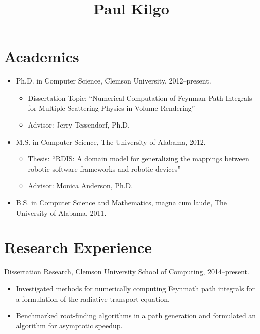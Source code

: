 \documentclass[12pt,oldfontcommands]{memoir}
\title{Paul Kilgo}
\date{}
\begin{document}
\maketitle
\thispagestyle{fancy}

\section*{Academics}

\begin{itemize}[leftmargin=*]
  \item Ph.D. in Computer Science, Clemson University, 2012--present.
  \begin{itemize}
    \item Dissertation Topic:
          ``Numerical Computation of Feynman Path Integrals for Multiple
            Scattering Physics in Volume Rendering''
    \item Advisor: Jerry Tessendorf, Ph.D.
  \end{itemize}

  \item M.S. in Computer Science, The University of Alabama, 2012.
  \begin{itemize}
    \item Thesis: ``RDIS: A domain model for generalizing the mappings between
                    robotic software frameworks and robotic devices''
    \item Advisor: Monica Anderson, Ph.D.
  \end{itemize}

  \item B.S. in Computer Science and Mathematics, magna cum laude, The
        University of Alabama, 2011.
\end{itemize}

\section*{Research Experience}

Dissertation Research, Clemson University School of Computing, 2014--present.

\begin{itemize}
  \item Investigated methods for numerically computing Feynmath path integrals
        for a formulation of the radiative transport equation.
  \item Benchmarked root-finding algorithms in a path generation and formulated
        an algorithm for asymptotic speedup.
\end{itemize}
\end{document}
